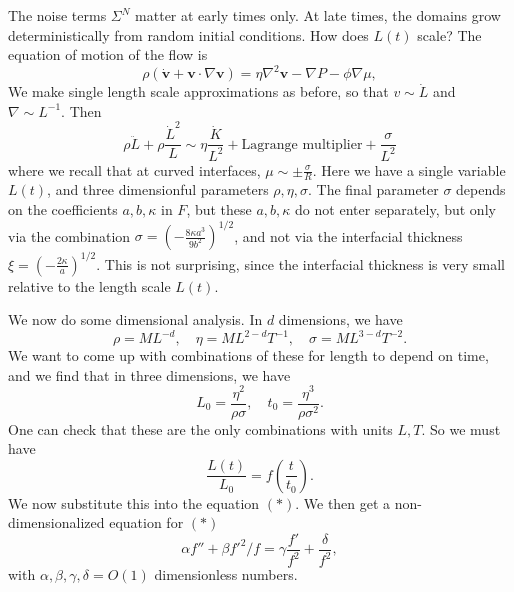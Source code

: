 \documentclass[a4paper]{article}
\begin{document}
The noise terms $\Sigma^N$ matter at early times only. At late times, the domains grow deterministically from random initial conditions. How does $L(t)$ scale? The equation of motion of the flow is
\[
  \rho(\dot{\mathbf{v}} + \mathbf{v} \cdot \nabla \mathbf{v}) = \eta \nabla^2 \mathbf{v} - \nabla P - \phi \nabla \mu,
\]
We make single length scale approximations as before, so that $v \sim \dot{L}$ and $\nabla \sim L^{-1}$. Then
\[
  \rho \ddot{L} + \rho \frac{\dot{L}^2}{L} \sim \eta \frac{\dot{K}}{L^2} + \text{Lagrange multiplier} + \frac{\sigma}{L^2}\tag{$*$} %
\]
where we recall that at curved interfaces, $\mu \sim \pm \frac{\sigma}{R}$. Here we have a single variable $L(t)$, and three dimensionful parameters $\rho, \eta, \sigma$. The final parameter $\sigma$ depends on the coefficients $a, b, \kappa$ in $F$, but these $a, b, \kappa$ do not enter separately, but only via the combination $\sigma = \left(-\frac{8 \kappa a^3}{9b^2}\right)^{1/2}$, and not via the interfacial thickness $\xi = \left(-\frac{2\kappa}{a}\right)^{1/2}$. This is not surprising, since the interfacial thickness is very small relative to the length scale $L(t)$.

We now do some dimensional analysis. In $d$ dimensions, we have
\[
  \rho = ML^{-d},\quad \eta = M L^{2 - d} T^{-1},\quad \sigma = ML^{3 - d} T^{-2}.
\]
We want to come up with combinations of these for length to depend on time, and we find that in three dimensions, we have
\[
  L_0 = \frac{\eta^2}{\rho \sigma},\quad t_0 = \frac{\eta^3}{\rho \sigma^2}.
\]
One can check that these are the only combinations with units $L, T$. So we must have
\[
  \frac{L(t)}{L_0} = f \left(\frac{t}{t_0}\right).
\]
We now substitute this into the equation $(*)$. We then get a non-dimensionalized equation for $(*)$
\[
  \alpha f'' + \beta f'^2/f = \gamma \frac{f'}{f^2} + \frac{\delta}{f^2},
\]
with $\alpha, \beta, \gamma, \delta = O(1)$ dimensionless numbers.
\end{document}
